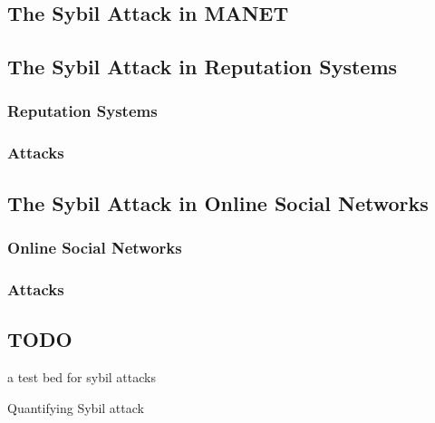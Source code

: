 \subsection{The Sybil Attack in MANET}

\subsection{The Sybil Attack in Reputation Systems}

\subsubsection{Reputation Systems}
\subsubsection{Attacks}

\subsection{The Sybil Attack in Online Social Networks}
\subsubsection{Online Social Networks}
\subsubsection{Attacks}

\subsection{TODO}
a test bed for sybil attacks\cite{irissappane2012towards}

Quantifying Sybil attack\cite{margolin2008quantifying}

